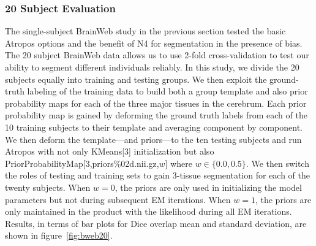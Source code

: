 \documentclass[11pt,english]{article}
\begin{document}
\subsubsection{20 Subject Evaluation} The single-subject BrainWeb
study in the previous section tested the basic Atropos options and the
benefit of N4 for segmentation in the presence of bias.  The 20
subject BrainWeb data allows us to use 2-fold cross-validation to test
our ability to segment different individuals reliably.  In this study,
we divide the 20 subjects equally into training and testing groups.
We then exploit the ground-truth labeling of the training data to
build both a group template \citep{Avants2010} and also prior
probability maps for each of the three major tissues in the cerebrum.
Each prior probability map is gained by deforming the ground truth
labels from each of the 10 training subjects to their template and
averaging component by component.  We then deform the template---and
priors---to the ten testing subjects and run Atropos with not only
{\ttfamily KMeans[3]} initialization but also {\ttfamily
  PriorProbabilityMap[3,priors\%02d.nii.gz,$w$] } where $w \in
\{0.0,0.5\}$.  We then switch the roles of testing and training sets to
gain 3-tissue segmentation for each of the twenty subjects.  
When $w=0$, the priors are only used in initializing
the model parameters but not during subsequent EM iterations.  
When $w=1$, the priors are only maintained in the product with the
likelihood during all EM iterations.  Results, in terms of bar
plots for Dice overlap mean and standard deviation, are shown in figure~\ref{fig:bweb20}.
\end{document}
